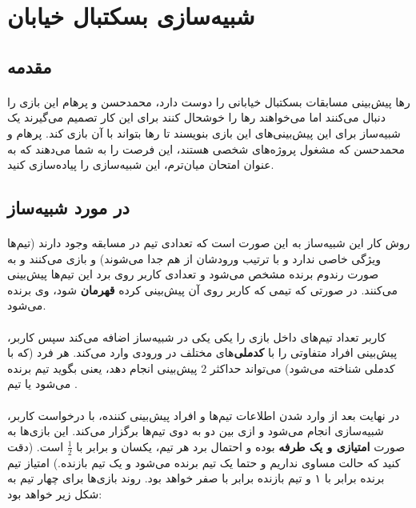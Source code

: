 \documentclass[../main.tex]{subfiles}
\begin{document}
\section{شبیه‌سازی بسکتبال خیابان}

\subsection{مقدمه}
\paragraph{}
رها پیش‌بینی مسابقات بسکتبال خیابانی را دوست دارد، محمدحسن و پرهام این بازی را دنبال می‌کنند اما می‌خواهند رها را خوشحال کنند
برای این کار تصمیم می‌گیرند یک شبیه‌ساز برای این پیش‌بینی‌های این بازی بنویسند تا رها بتواند با آن بازی کند.
پرهام و محمدحسن که مشغول پروژه‌های شخصی هستند، این فرصت را به شما می‌دهند که به عنوان امتحان میان‌ترم، این شبیه‌سازی را پیاده‌سازی کنید.

\subsection{در مورد شبیه‌ساز}
\paragraph{}
روش کار این شبیه‌ساز به این صورت است که تعدادی تیم در مسابقه وجود دارند (تیم‌ها ویژگی خاصی ندارد و با ترتیب ورودشان از هم جدا می‌شوند) 
و بازی می‌کنند و به صورت رندوم برنده مشخص می‌شود و تعدادی کاربر روی برد این تیم‌ها پیش‌بینی می‌کنند.
در صورتی که تیمی که کاربر روی آن پیش‌بینی کرده \textbf{قهرمان} شود، وی برنده می‌شود.

\paragraph{}
کاربر تعداد تیم‌های داخل بازی را یکی یکی در شبیه‌ساز اضافه می‌کند
سپس کاربر، پیش‌بینی افراد متفاوتی را با \textbf{کدملی}‌های مختلف در ورودی وارد می‌کند.
هر فرد (که با کدملی شناخته می‌شود) می‌تواند حداکثر 2 پیش‌بینی انجام دهد،
یعنی بگوید تیم  برنده می‌شود یا تیم .

\paragraph{}
در نهایت بعد از وارد شدن اطلاعات تیم‌ها و  افراد پیش‌بینی کننده، با درخواست کاربر، شبیه‌سازی انجام می‌شود و
ازی بین دو به دوی تیم‌ها برگزار می‌کند.
این بازی‌ها به صورت
\textbf{امتیازی و یک طرفه}
بوده و احتمال برد هر تیم‌، یکسان و برابر با
\(\frac{1}{2}\)
است. 
(دقت کنید که حالت مساوی نداریم و حتما یک تیم برنده می‌شود و یک تیم بازنده.)
امتیاز تیم برنده برابر با ۱ و تیم بازنده برابر با صفر خواهد بود.
روند بازی‌ها برای چهار تیم به شکل زیر خواهد بود:
\end{document}
